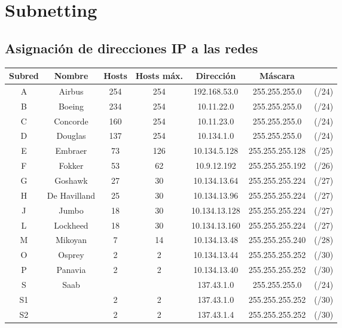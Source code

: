 \documentclass[12pt, a4paper, spanish]{article}
\begin{document}


\newpage
\tableofcontents

\newpage
\section{Subnetting}
\subsection{Asignación de direcciones IP a las redes}
\begin{center}
\begin{tabular}{|c|c|c|c|c|c c|}
	\hline
	Subred & Nombre 	& Hosts 	& Hosts máx. & Dirección 	& Máscara & \\
	\hline
	\hline
	A & Airbus 		& 254 & 254 	& 192.168.53.0 	& 255.255.255.0 & (/24) \\
	\hline
	B & Boeing 		& 234 & 254 	& 10.11.22.0 	& 255.255.255.0 & (/24) \\
	\hline
	C & Concorde 	& 160 & 254 	& 10.11.23.0 	& 255.255.255.0 & (/24) \\
	\hline
	D & Douglas 		& 137 & 254 	& 10.134.1.0 	& 255.255.255.0 & (/24) \\
	\hline
	E & Embraer 		& 73 & 126 	& 10.134.5.128 	& 255.255.255.128 & (/25) \\
	\hline
	F & Fokker 		& 53 & 62 	& 10.9.12.192 	& 255.255.255.192 & (/26) \\
	\hline
	G & Goshawk 		& 27 & 30 	& 10.134.13.64 	& 255.255.255.224 & (/27) \\
	\hline
	H & De Havilland & 25 & 30 	& 10.134.13.96 	& 255.255.255.224 & (/27) \\
	\hline
	J & Jumbo 		& 18 & 30 	& 10.134.13.128 	& 255.255.255.224 & (/27) \\
	\hline
	L & Lockheed 	& 18 & 30 	& 10.134.13.160 	& 255.255.255.224 & (/27) \\
	\hline
	M & Mikoyan 		& 7 & 14 	& 10.134.13.48 	& 255.255.255.240 & (/28) \\
	\hline
	O & Osprey 		& 2 & 2 		& 10.134.13.44 	& 255.255.255.252 & (/30) \\
	\hline
	P & Panavia 		& 2 & 2 		& 10.134.13.40 	& 255.255.255.252 & (/30) \\
	\hline
	S & Saab 		& & 			& 137.43.1.0 	& 255.255.255.0 & (/24) \\
	\hline
	S1 & 			& 2 & 2 		& 137.43.1.0 	& 255.255.255.252 & (/30) \\
	\hline
	S2 & 			& 2 & 2 		& 137.43.1.4 	& 255.255.255.252 & (/30) \\

\end{tabular}
\end{center}
\end{document}
